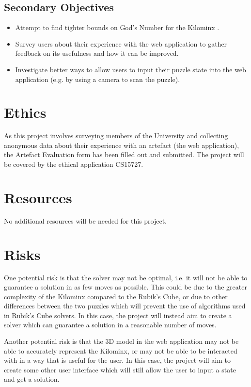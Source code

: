 \documentclass[12pt]{article}
\begin{document}
\subsection{Secondary Objectives}
\begin{itemize}
    \item Attempt to find tighter bounds on God's Number for the Kilominx \cite{kilominxgodbounds}.
    \item Survey users about their experience with the web application to gather feedback on its usefulness and how it can be improved.
    \item Investigate better ways to allow users to input their puzzle state into the web application (e.g. by using a camera to scan the puzzle).
\end{itemize}

\section{Ethics}
As this project involves surveying members of the University and collecting anonymous data about their experience with an artefact (the web application), the Artefact Evaluation form has been filled out and submitted. The project will be covered by the ethical application CS15727.

\section{Resources}
No additional resources will be needed for this project.

\section{Risks}
One potential risk is that the solver may not be optimal, i.e. it will not be able to guarantee a solution in as few moves as possible. This could be due to the greater complexity of the Kilominx compared to the Rubik's Cube, or due to other differences between the two puzzles which will prevent the use of algorithms used in Rubik's Cube solvers. In this case, the project will instead aim to create a solver which can guarantee a solution in a reasonable number of moves.

Another potential risk is that the 3D model in the web application may not be able to accurately represent the Kilominx, or may not be able to be interacted with in a way that is useful for the user. In this case, the project will aim to create some other user interface which will still allow the user to input a state and get a solution.

\printbibliography
\end{document}
